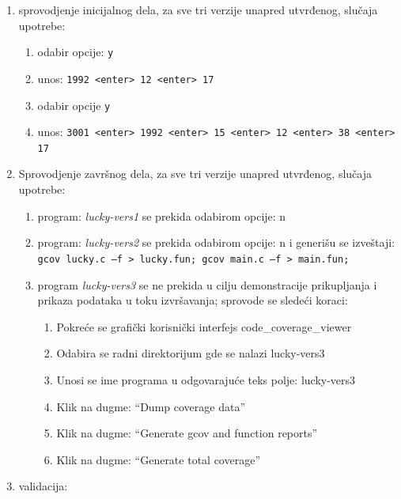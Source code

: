 \documentclass[12pt,oneside]{memoir}
\newcommand{\kod}[1]{\texttt{#1}}
\newcommand{\strano}[1]{\textit{#1}}
\begin{document}
\begin{enumerate}
\item sprovodjenje inicijalnog dela, za sve tri verzije unapred utvrđenog, slučaja upotrebe:
\begin{enumerate}
\item odabir opcije: \kod{y}
\item unos: \kod{1992 <enter> 12 <enter> 17}
\item odabir opcije \kod{y}
\item unos: \kod{3001 <enter> 1992 <enter> 15 <enter> 12  <enter> 38 <enter> 17}
\end{enumerate}
\item Sprovodjenje završnog dela, za sve tri verzije unapred utvrđenog, slučaja upotrebe:
\begin{enumerate}
\item program: \strano{lucky-vers1} se prekida odabirom opcije: n
\item program: \strano{lucky-vers2} se prekida odabirom opcije: n i generišu se izveštaji:\kod{ gcov lucky.c –f  > lucky.fun; gcov main.c –f  > main.fun;}
\item program \strano{lucky-vers3} se ne prekida u cilju demonstracije prikupljanja i prikaza podataka u toku izvršavanja; sprovode se sledeći koraci:
\begin{enumerate}
\item Pokreće se grafički korisnički interfejs code\_coverage\_viewer
\item Odabira se radni direktorijum gde se nalazi lucky-vers3
\item Unosi se ime programa u odgovarajuće teks polje: lucky-vers3
\item Klik na dugme: “Dump coverage data”
\item Klik na dugme: “Generate gcov and function reports”
\item Klik na dugme: “Generate total coverage”
\end{enumerate}
\end{enumerate}
\item validacija: 
\begin{enumerate}


\end{enumerate}
\end{enumerate}
\end{document}
